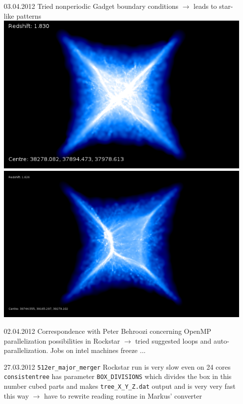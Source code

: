 \documentclass[a4paper,11pt,fleqn,oneside]{book}
\begin{document}
\begin{itemize}
\item[03.04.2012]
Tried nonperiodic Gadget boundary conditions $\rightarrow$ leads 
to star-like patterns \\
\includegraphics[scale=0.3]{r256/h100/nonperiodictest/drd5nonperiodic.png}
\includegraphics[scale=0.2]{r256/h100/nonperiodictest/stages20nonperiodic.png} \\


\item[02.04.2012]
Correspondence with Peter Behroozi concerning OpenMP parallelization
possibilities in Rockstar  $\rightarrow$ tried suggested loops 
and auto-parallelization. Jobs on intel machines freeze ... 

\item[27.03.2012] 
\texttt{512er\_major\_merger} Rockstar run is very slow even 
on 24 cores \\
\texttt{consistentree} has parameter \texttt{BOX\_DIVISIONS} which divides 
the box in this number cubed parts and makes \texttt{tree\_X\_Y\_Z.dat} 
output and is very very fast this way 
$\rightarrow$ have to rewrite reading routine in Markus' 
converter \\


\end{itemize}
\end{document}
